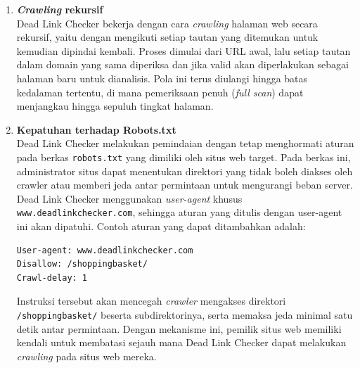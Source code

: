 \begin{enumerate}
    \item \textbf{\textit{Crawling} rekursif}\\
    Dead Link Checker bekerja dengan cara \textit{crawling} halaman web secara rekursif, yaitu dengan mengikuti setiap tautan yang ditemukan untuk kemudian dipindai kembali. Proses dimulai dari URL awal, lalu setiap tautan dalam domain yang sama diperiksa dan jika valid akan diperlakukan sebagai halaman baru untuk dianalisis. Pola ini terus diulangi hingga batas kedalaman tertentu, di mana pemeriksaan penuh (\textit{full scan}) dapat menjangkau hingga sepuluh tingkat halaman. 

    \item \textbf{Kepatuhan terhadap Robots.txt}\\
    Dead Link Checker melakukan pemindaian dengan tetap menghormati aturan pada berkas \texttt{robots.txt} yang dimiliki oleh situs web target. Pada berkas ini, administrator situs dapat menentukan direktori yang tidak boleh diakses oleh crawler atau memberi jeda antar permintaan untuk mengurangi beban server. Dead Link Checker menggunakan \textit{user-agent} khusus \texttt{www.deadlinkchecker.com}, sehingga aturan yang ditulis dengan user-agent ini akan dipatuhi. Contoh aturan yang dapat ditambahkan adalah:
    
\begin{verbatim}
User-agent: www.deadlinkchecker.com
Disallow: /shoppingbasket/
Crawl-delay: 1
\end{verbatim}

    Instruksi tersebut akan mencegah \textit{crawler} mengakses direktori \texttt{/shoppingbasket/} beserta subdirektorinya, serta memaksa jeda minimal satu detik antar permintaan. Dengan mekanisme ini, pemilik situs web memiliki kendali untuk membatasi sejauh mana Dead Link Checker dapat melakukan \textit{crawling} pada situs web mereka.

\end{enumerate}
